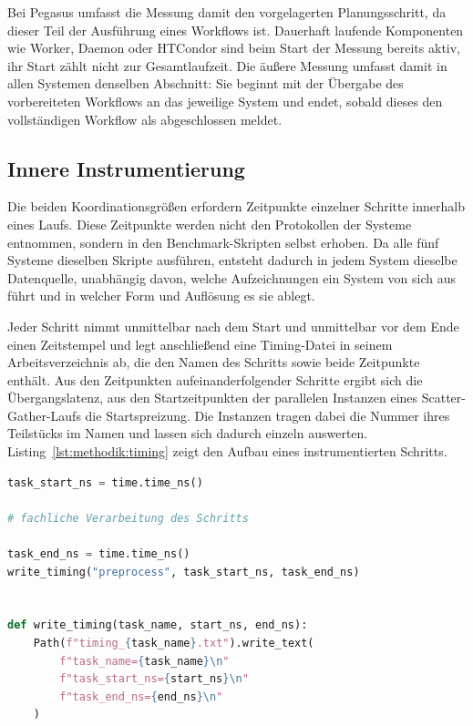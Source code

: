 Bei Pegasus umfasst die Messung damit den vorgelagerten
Planungsschritt, da dieser Teil der Ausführung eines Workflows ist. Dauerhaft laufende Komponenten wie Worker, Daemon oder HTCondor sind beim Start der Messung bereits aktiv, ihr Start zählt nicht zur Gesamtlaufzeit. Die äußere Messung umfasst damit in allen Systemen denselben Abschnitt: Sie beginnt mit der Übergabe des vorbereiteten Workflows an das jeweilige System und endet, sobald dieses den vollständigen Workflow als abgeschlossen meldet.

\subsection{Innere Instrumentierung}
\label{sec:methodik:instrumentierung}

Die beiden Koordinationsgrößen erfordern Zeitpunkte einzelner
Schritte innerhalb eines Laufs. Diese Zeitpunkte werden nicht den
Protokollen der Systeme entnommen, sondern in den
Benchmark-Skripten selbst erhoben. Da alle fünf Systeme dieselben
Skripte ausführen, entsteht dadurch in jedem System dieselbe
Datenquelle, unabhängig davon, welche Aufzeichnungen ein System von
sich aus führt und in welcher Form und Auflösung es sie ablegt.

Jeder Schritt nimmt unmittelbar nach dem Start und unmittelbar vor
dem Ende einen Zeitstempel und legt anschließend eine Timing-Datei
in seinem Arbeitsverzeichnis ab, die den Namen des Schritts sowie
beide Zeitpunkte enthält. Aus den Zeitpunkten aufeinanderfolgender
Schritte ergibt sich die Übergangslatenz, aus den Startzeitpunkten
der parallelen Instanzen eines Scatter-Gather-Laufs die
Startspreizung. Die Instanzen tragen dabei die Nummer ihres
Teilstücks im Namen und lassen sich dadurch einzeln auswerten.
Listing~\ref{lst:methodik:timing} zeigt den Aufbau eines
instrumentierten Schritts.

\begin{lstlisting}[language=Python,
  caption={Aufbau eines instrumentierten Benchmark-Schritts},
  label={lst:methodik:timing}]
task_start_ns = time.time_ns()

# fachliche Verarbeitung des Schritts

task_end_ns = time.time_ns()
write_timing("preprocess", task_start_ns, task_end_ns)


def write_timing(task_name, start_ns, end_ns):
    Path(f"timing_{task_name}.txt").write_text(
        f"task_name={task_name}\n"
        f"task_start_ns={start_ns}\n"
        f"task_end_ns={end_ns}\n"
    )
\end{lstlisting}

